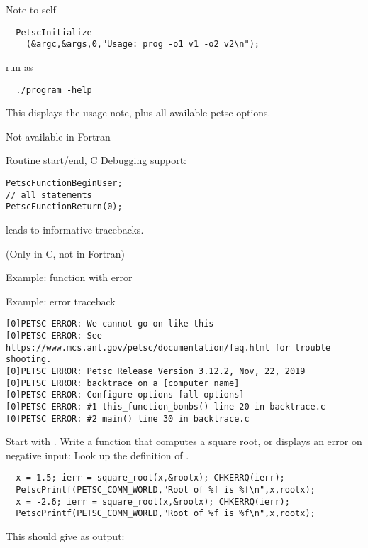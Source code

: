 \lstset{language=C}
\begin{details}
\begin{numberedframe}{Note to self}
\begin{lstlisting}
  PetscInitialize
    (&argc,&args,0,"Usage: prog -o1 v1 -o2 v2\n");
\end{lstlisting}
run as
\begin{verbatim}
  ./program -help
\end{verbatim}
This displays the usage note, plus all available petsc options.

Not available in Fortran
\end{numberedframe}

\begin{numberedframe}{Routine start/end, C}
Debugging support:
\begin{lstlisting}
PetscFunctionBeginUser;
// all statements
PetscFunctionReturn(0);
\end{lstlisting}
leads to informative tracebacks.

(Only in C, not in Fortran)
\end{numberedframe}

\begin{numberedframe}{Example: function with error}
\end{numberedframe}

\begin{numberedframe}{Example: error traceback}
\footnotesize
\begin{verbatim}
[0]PETSC ERROR: We cannot go on like this
[0]PETSC ERROR: See https://www.mcs.anl.gov/petsc/documentation/faq.html for trouble shooting.
[0]PETSC ERROR: Petsc Release Version 3.12.2, Nov, 22, 2019
[0]PETSC ERROR: backtrace on a [computer name]
[0]PETSC ERROR: Configure options [all options]
[0]PETSC ERROR: #1 this_function_bombs() line 20 in backtrace.c
[0]PETSC ERROR: #2 main() line 30 in backtrace.c
\end{verbatim}
\end{numberedframe}

\begin{exerciseframe}[root]
Start with . Write a function that computes a square root,
or displays an error on negative input:
Look up the definition of .
\begin{lstlisting}
  x = 1.5; ierr = square_root(x,&rootx); CHKERRQ(ierr);
  PetscPrintf(PETSC_COMM_WORLD,"Root of %f is %f\n",x,rootx);
  x = -2.6; ierr = square_root(x,&rootx); CHKERRQ(ierr);
  PetscPrintf(PETSC_COMM_WORLD,"Root of %f is %f\n",x,rootx);
\end{lstlisting}
This should give as output:


\end{exerciseframe}
\end{details}
